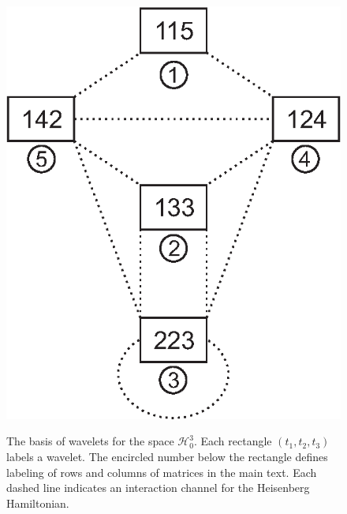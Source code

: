 \documentclass{elsarticle}
\begin{document}
\begin{figure}[ht]
\begin{center}
\includegraphics*[width=0.35\linewidth]{figure1.eps}
\label{fig_basisk}
\end{center}
\caption{The basis of wavelets for the space $\mathcal{H}^3_0$. Each rectangle $(t_1,t_2,t_3)$ labels a wavelet. The encircled number below the rectangle defines labeling of rows and columns of matrices in the main text. Each dashed line indicates an interaction channel for the Heisenberg Hamiltonian.}
\end{figure}
\end{document}
